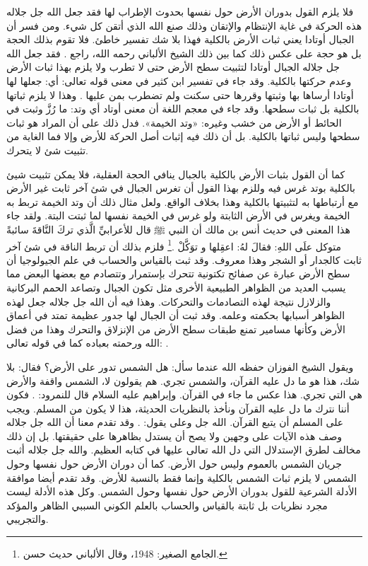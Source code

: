 فلا يلزم القول بدوران الأرض حول نفسها بحدوث الإطراب لها فقد جعل الله جل جلاله هذه الحركة في غاية الإنتظام والإتقان وذلك صنع الله الذي أتقن كل شيء. ومن فسر أن الجبال أوتادا يعني ثبات الأرض بالكلية فهذا بلا شك تفسير خاطئ. فلا تقوم بذلك الحجة بل هو حجة على عكس ذلك كما بين ذلك الشيخ الألباني رحمه الله، راجع . فقد جعل الله جل جلاله الجبال أوتادا لتثبيت سطح الأرض حتى لا تطرب ولا يلزم بهذا ثبات الأرض وعدم حركتها بالكلية. وقد جاء في تفسير ابن كثير في معنى قوله تعالى: \quranayah*[78][6-7]{\footnotesize \surahname*[78]} أي: جعلها لها أوتادا أرساها بها وثبتها وقررها حتى سكنت ولم تضطرب بمن عليها \cite{tafsir_ibnKathir}. وهذا لا يلزم ثباتها بالكلية بل ثبات سطحها. وقد جاء في معجم اللغة أن معنى أوتاد أي وتد: ما رُزَّ وثبت في الحائط أو الأرض من خشب وغيره: «وتد الخيمة». فدل ذلك على أن المراد هو ثبات سطحها وليس ثباتها بالكلية. بل أن ذلك فيه إثبات أصل الحركة للأرض وإلا فما الغاية من تثبيت شئ لا يتحرك. 

كما أن القول بثبات الأرض بالكلية بالجبال ينافي الحجة العقلية، فلا يمكن تثبيت شيئ بالكلية بوتد غرس فيه وللزم بهذا القول أن تغرس الجبال في شئ آخر ثابت غير الأرض مع أرتباطها به لتثبيتها بالكلية وهذا بخلاف الواقع. ولعل مثال ذلك أن وتد الخيمة تربط به الخيمة ويغرس في الأرض الثابتة ولو غرس في الخيمة نفسها لما ثبتت البتة. ولقد جاء هذا المعنى في حديث أنس بن مالك أن النبي ﷺ قال للأعرابيِّ الَّذي تركَ النَّاقةَ سائبةً متوكل علَى اللهِ: فقالَ لهُ: اعقِلها و توَكَّلْ \href{https://shamela.ws/book/21659/1948#p1}{\faExternalLink} \cite{jamaaSagheer}.\footnote{الجامع الصغير: 1948، وقال الألباني حديث حسن.} فلزم بذلك أن تربط الناقة في شئ آخر ثابت كالجدار أو الشجر وهذا معروف. وقد ثبت بالقياس والحساب في علم الجيولوجيا أن سطح الأرض عبارة عن صفائح تكتونية تتحرك بإستمرار وتتصادم مع بعضها البعض مما يسبب العديد من الظواهر الطبيعية الأخرى مثل تكون الجبال وتصاعد الحمم البركانية والزلازل نتيجة لهذه التصادمات والتحركات. وهذا فيه أن الله جل جلاله جعل لهذه الظواهر أسبابها بحكمته وعلمه. وقد ثبت أن الجبال لها جدور عظيمة تمتد في أعماق الأرض وكأنها مسامير تمنع طبقات سطح الأرض من الإنزلاق والتحرك وهذا من فضل الله ورحمته بعباده كما في قوله تعالى: \quranayah*[16][15]{\footnotesize \surahname*[16]}.

ويقول الشيخ الفوزان حفظه الله عندما سأل: هل الشمس تدور على الأرض؟ فقال: بلا شك، هذا هو ما دل عليه القرآن، والشمس تجري. هم يقولون لا، الشمس واقفة والأرض هي التي تجري. هذا عكس ما جاء في القرآن. وإبراهيم عليه السلام قال للنمرود: \quranayah*[2][258][26-38] {\footnotesize (\surahname*[2])}. فكون أننا نترك ما دل عليه القرآن ونأخذ بالنظريات الحديثة، هذا لا يكون من المسلم. ويجب على المسلم أن يتبع القرآن. الله جل وعلى يقول: 
\quranayah*[18][51] {\footnotesize (\surahname*[18])} \href{https://www.youtube.com/watch?v=32PPmN-Tq9g}{\faExternalLink}. وقد تقدم معنا أن الله جل جلاله وصف هذه الآيات على وجهين ولا يصح أن يستدل بظاهرها على حقيقتها. بل إن ذلك مخالف لطرق الإستدلال التي دل الله تعالى عليها في كتابه العظيم. والله جل جلاله أثبت جريان الشمس بالعموم وليس حول الأرض. كما أن دوران الأرض حول نفسها وحول الشمس لا يلزم ثبات الشمس بالكلية وإنما فقط بالنسبة للأرض. وقد تقدم أيضا موافقة الأدلة الشرعية للقول بدوران الأرض حول نفسها وحول الشمس. وكل هذه الأدلة ليست مجرد نظريات بل ثابتة بالقياس والحساب بالعلم الكوني السببي الظاهر والمؤكد والتجريبي. 

